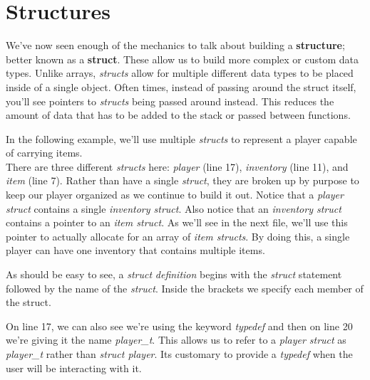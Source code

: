 \documentclass[../main.tex]{subfiles}
\begin{document}
	
	\chapter{Structures}\label{ch:5}
	
	We've now seen enough of the mechanics to talk about building a \textbf{structure}; better known as a \textbf{struct}. These allow us to build more complex or custom data types.  Unlike arrays, \textit{structs} allow for multiple different data types to be placed inside of a single object.  Often times, instead of passing around the struct itself, you'll see pointers to \textit{structs} being passed around instead.  This reduces the amount of data that has to be added to the stack or passed between functions.  
	
	In the following example, we'll use multiple \textit{structs} to represent a player capable of carrying items.\\
	
		
	
	There are three different \textit{structs} here: \textit{player} (line 17), \textit{inventory} (line 11), and \textit{item} (line 7).  Rather than have a single \textit{struct}, they are broken up by purpose to keep our player organized as we continue to build it out. Notice that a \textit{player struct} contains a single \textit{inventory struct}.  Also notice that an \textit{inventory struct} contains a pointer to an \textit{item struct}.  As we'll see in the next file, we'll use this pointer to actually allocate for an array of \textit{item structs}.  By doing this, a single player can have one inventory that contains multiple items.
	
	As should be easy to see, a \textit{struct} \textit{definition} begins with the \textit{struct} statement followed by the name of the \textit{struct}.  Inside the brackets we specify each member of the struct.
	
	On line 17, we can also see we're using the keyword \textit{typedef} and then on line 20 we're giving it the name \textit{player\_t}.  This allows us to refer to a \textit{player struct} as \textit{player\_t} rather than \textit{struct player}. Its customary to provide a \textit{typedef} when the user will be interacting with it. \\
	
\end{document}
